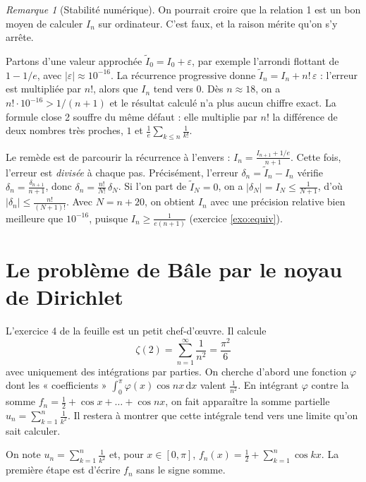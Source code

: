 \documentclass[11pt,a4paper]{article}
\theoremstyle{plain}
\theoremstyle{definition}
\theoremstyle{remark}
\newtheorem{remarque}[theoreme]{Remarque}
\newcommand{\dd}{\,\mathrm{d}}
\begin{document}
\begin{remarque}[Stabilité numérique]
On pourrait croire que la relation 1 est un bon moyen de calculer $I_n$ sur ordinateur. C'est faux, et la raison mérite qu'on s'y arrête.

Partons d'une valeur approchée $\tilde I_0=I_0+\varepsilon$, par exemple l'arrondi flottant de $1-1/e$, avec $|\varepsilon|\approx10^{-16}$. La récurrence progressive donne $\tilde I_n=I_n+n!\,\varepsilon$ : l'erreur est multipliée par $n!$, alors que $I_n$ tend vers $0$. Dès $n\approx18$, on a $n!\cdot10^{-16}>1/(n+1)$ et le résultat calculé n'a plus aucun chiffre exact. La formule close 2 souffre du même défaut : elle multiplie par $n!$ la différence de deux nombres très proches, $1$ et $\frac1e\sum_{k\leq n}\frac1{k!}$.

Le remède est de parcourir la récurrence à l'envers : $I_n=\frac{I_{n+1}+1/e}{n+1}$. Cette fois, l'erreur est \emph{divisée} à chaque pas. Précisément, l'erreur $\delta_n=\tilde I_n-I_n$ vérifie $\delta_n=\frac{\delta_{n+1}}{n+1}$, donc $\delta_n=\frac{n!}{N!}\,\delta_N$. Si l'on part de $\tilde I_N=0$, on a $|\delta_N|=I_N\leq\frac1{N+1}$, d'où $|\delta_n|\leq\frac{n!}{(N+1)!}$. Avec $N=n+20$, on obtient $I_n$ avec une précision relative bien meilleure que $10^{-16}$, puisque $I_n\geq\frac{1}{e(n+1)}$ (exercice \ref{exo:equiv}).
\end{remarque}

\section{Le problème de Bâle par le noyau de Dirichlet}

L'exercice 4 de la feuille est un petit chef-d'œuvre. Il calcule
\[
  \zeta(2)=\sum_{n=1}^\infty\frac1{n^2}=\frac{\pi^2}6
\]
avec uniquement des intégrations par parties. On cherche d'abord une fonction $\varphi$ dont les « coefficients » $\int_0^\pi\varphi(x)\cos nx\dd x$ valent $\frac1{n^2}$. En intégrant $\varphi$ contre la somme $f_n=\frac12+\cos x+\dots+\cos nx$, on fait apparaître la somme partielle $u_n=\sum_{k=1}^n\frac1{k^2}$. Il restera à montrer que cette intégrale tend vers une limite qu'on sait calculer.

On note $u_n=\sum_{k=1}^n\frac1{k^2}$ et, pour $x\in[0,\pi]$, $f_n(x)=\frac12+\sum_{k=1}^n\cos kx$. La première étape est d'écrire $f_n$ sans le signe somme.
\end{document}

